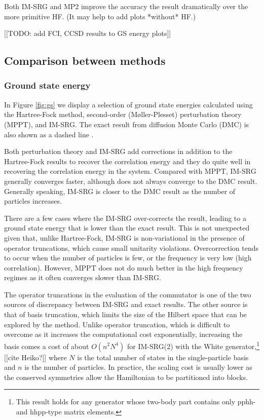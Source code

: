 Both IM-SRG and MP2 improve the accuracy the result dramatically over the more primitive HF.  (It may help to add plots *without* HF.)

[[TODO: add FCI, CCSD results to GS energy plots]]

\subsection{Comparison between methods}

\subsubsection{Ground state energy}

In Figure \ref{fig:gs} we display a selection of ground state energies calculated using the Hartree-Fock method, second-order (M\o ller-Plesset) perturbation theory (MPPT), and IM-SRG.  The exact result from diffusion Monte Carlo (DMC) is also shown as a dashed line \cite{PhysRevB.84.115302}.

Both perturbation theory and IM-SRG add corrections in addition to the Hartree-Fock results to recover the correlation energy and they do quite well in recovering the correlation energy in the system.  Compared with MPPT, IM-SRG generally converges faster, although does not always converge to the DMC result.  Generally speaking, IM-SRG is closer to the DMC result as the number of particles increases.

There are a few cases where the IM-SRG over-corrects the result, leading to a ground state energy that is lower than the exact result.  This is not unexpected given that, unlike Hartree-Fock, IM-SRG is non-variational in the presence of operator truncations, which cause small unitarity violations.  Overcorrection tends to occur when the number of particles is few, or the frequency is very low (high correlation).  However, MPPT does not do much better in the high frequency regimes as it often converges slower than IM-SRG.

The operator truncations in the evaluation of the commutator is one of the two sources of discrepancy between IM-SRG and exact results.  The other source is that of basis truncation, which limits the size of the Hilbert space that can be explored by the method.  Unlike operator truncation, which is difficult to overcome as it increases the computational cost exponentially, increasing the basis comes a cost of about $O(n^2 N^4)$ for IM-SRG(2) with the White generator,\footnote{This result holds for any generator whose two-body part contains only pphh- and hhpp-type matrix elements.} [[cite Heiko?]] where $N$ is the total number of states in the single-particle basis and $n$ is the number of particles.  In practice, the scaling cost is usually lower as the conserved symmetries allow the Hamiltonian to be partitioned into blocks.

